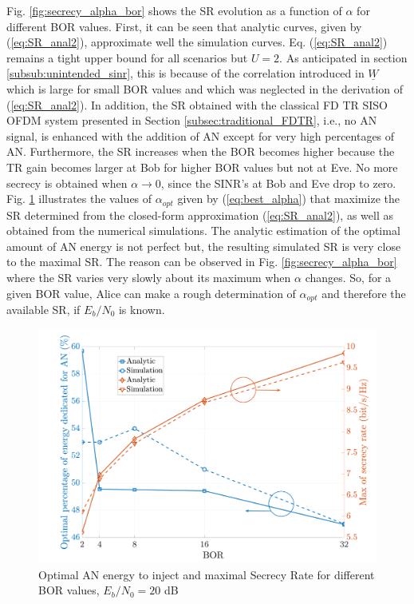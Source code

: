 \documentclass[a4paper,11pt]{article}
\begin{document}
Fig. \ref{fig:secrecy_alpha_bor} shows the SR evolution as a function of $\alpha$ for different BOR values. First, it can be seen that analytic curves, given by (\ref{eq:SR_anal2}), approximate well the simulation curves. Eq. (\ref{eq:SR_anal2}) remains a tight upper bound for all scenarios but $U=2$. As anticipated in section \ref{subsub:unintended_sinr}, this is because of the correlation introduced in $\underline{W}$ which is large for small BOR values and which was neglected in the derivation of (\ref{eq:SR_anal2}). In addition, the SR obtained with the classical FD TR SISO OFDM system presented in Section \ref{subsec:traditional_FDTR}, i.e., no AN signal, is enhanced with the addition of AN except for very high percentages of AN. Furthermore, the SR increases when the BOR becomes higher because the TR gain becomes larger at Bob for higher BOR values but not at Eve. No more secrecy is obtained when $\alpha \to 0$, since the SINR's at Bob and Eve drop to zero.\\
Fig. \ref{fig:secrecy_alpha_bor_optimal} illustrates the values of $\alpha_{opt}$ given by (\ref{eq:best_alpha}) that maximize the SR determined from the closed-form approximation (\ref{eq:SR_anal2}), as well as obtained from the numerical simulations. The analytic estimation of the optimal amount of AN energy is not perfect but, the resulting simulated SR is very close to the maximal SR. The reason can be observed in Fig. \ref{fig:secrecy_alpha_bor} where the SR varies very slowly about its maximum when $\alpha$ changes. So, for a given BOR value, Alice can make a rough determination of $\alpha_{opt}$ and therefore the available SR, if $E_b/N_0$ is known.  



\begin{figure}[t]
    \centering
    \centerline{\includegraphics[width = .37\textwidth]{img/final_optimal_alpha.pdf}}
    \caption{Optimal AN energy to inject and maximal Secrecy Rate for different BOR values, $E_b/N_0=20$ dB}
    \label{fig:secrecy_alpha_bor_optimal}
\end{figure}
\end{document}
